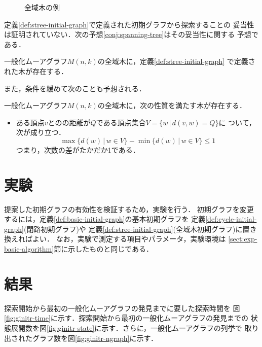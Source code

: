 \begin{figure}
  \centering
  \hfill
  \caption{全域木の例}
  \label{fig:initial-spanning-tree-example}
\end{figure}

定義\ref{def:stree-initial-graph}で定義された初期グラフから探索することの
妥当性は証明されていない．次の予想\ref{conj:spanning-tree}はその妥当性に関する
予想である．
\begin{conjecture}
  \label{conj:spanning-tree}
  一般化ムーアグラフ$M(n,k)$の全域木に，定義\ref{def:stree-initial-graph}
  で定義された木が存在する．
\end{conjecture}
また，条件を緩めて次のことも予想される．
\begin{conjecture}
  \label{conj:spanning-tree-2}
  一般化ムーアグラフ$M(n,k)$の全域木に，次の性質を満たす木が存在する．
  \begin{itemize}
  \item ある頂点$v$とのの距離が$Q$である頂点集合$V=\{w\,|\,d(v,w)=Q\}$に
    ついて，次が成り立つ． \\
    \[ \max\{d(w)\,|\,w\in V\}-\min\{d(w)\,|\,w\in V\}\leq 1 \]
    つまり，次数の差がたかだか1である．
  \end{itemize}
\end{conjecture}

\section{実験}
\label{sect:exp-reduce-by-initial}
提案した初期グラフの有効性を検証するため，実験を行う．
初期グラフを変更するには，定義\ref{def:basic-initial-graph}の基本初期グラフを
定義\ref{def:cycle-initial-graph}(閉路初期グラフ)や
定義\ref{def:stree-initial-graph}(全域木初期グラフ)に置き換えればよい．
なお，実験で測定する項目やパラメータ，実験環境は
\ref{sect:exp-basic-algorithm}節に示したものと同じである．

\section{結果}
\label{sect:result-reduce-by-initial}
探索開始から最初の一般化ムーアグラフの発見までに要した探索時間を
図\ref{fig:ginitr-time}に示す．探索開始から最初の一般化ムーアグラフの発見までの
状態展開数を図\ref{fig:ginitr-state}に示す．さらに，一般化ムーアグラフの列挙で
取り出されたグラフ数を図\ref{fig:ginitr-ngraph}に示す．

